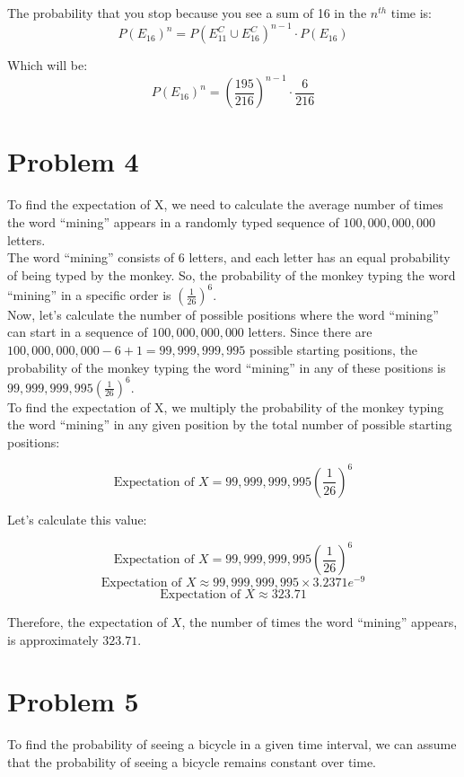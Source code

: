 	The probability that you stop because you see a sum of 16 in the $ n^{th} $ time is:
	\[
	P(E_{16})^{n} = P(E_{11}^{C} \cup E_{16}^{C})^{n-1} \cdot P(E_{16})
	\]
	
	Which will be:
	\[
	P(E_{16})^{n} = (\frac{195}{216})^{n-1} \cdot \frac{6}{216}
	\]

	\newpage
	\section*{Problem 4}\label{sec:prob-4}
	To find the expectation of X, we need to calculate the average number of times the word ``mining'' appears in a randomly typed sequence of $100,000,000,000$ letters.\\
	
	The word ``mining'' consists of $6$ letters, and each letter has an equal probability of being typed by the monkey. So, the probability of the monkey typing the word ``mining'' in a specific order is $\left(\frac{1}{26}\right)^6$.\\
	
	Now, let's calculate the number of possible positions where the word ``mining'' can start in a sequence of $100,000,000,000$ letters. Since there are $100,000,000,000 - 6 + 1 = 99,999,999,995$ possible starting positions, the probability of the monkey typing the word ``mining'' in any of these positions is $99,999,999,995 \left(\frac{1}{26}\right)^6$.\\
	
	To find the expectation of X, we multiply the probability of the monkey typing the word ``mining'' in any given position by the total number of possible starting positions:
	
	\[
	\text{Expectation of } X = 99,999,999,995 \left(\frac{1}{26}\right)^6
	\]
	
	Let's calculate this value:
	
	\[
	\text{Expectation of } X = 99,999,999,995 \left(\frac{1}{26}\right)^6
	\]
	\[
	\text{Expectation of } X \approx 99,999,999,995 \times 3.2371e^{-9}
	\]
	\[
	\text{Expectation of } X \approx 323.71
	\]
	
	Therefore, the expectation of $X$, the number of times the word ``mining'' appears, is approximately $323.71$.
	
	\newpage
	\section*{Problem 5}\label{sec:prob-5}
	To find the probability of seeing a bicycle in a given time interval, we can assume that the probability of seeing a bicycle remains constant over time. 
	
